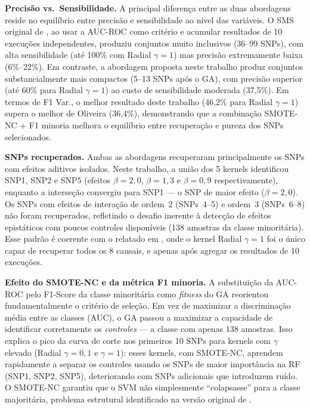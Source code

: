 \documentclass[
    12pt,
    a4paper,
    oneside,
    english,
    french,
    spanish,
    brazil
    ]{abntex2}
\newcommand{\novo}[1]{\textcolor{corNova}{#1}}
\begin{document}
\novo{\textbf{Precisão vs.\ Sensibilidade.}
A principal diferença entre as duas abordagens reside no equilíbrio entre precisão e sensibilidade ao nível das variáveis. O SMS original de \citeonline{Oliveira2015}, ao usar a AUC-ROC como critério e acumular resultados de 10 execuções independentes, produziu conjuntos muito inclusivos (36--99 SNPs), com alta sensibilidade (até 100\% com Radial $\gamma=1$) mas precisão extremamente baixa (6\%--22\%). Em contraste, a abordagem proposta neste trabalho produz conjuntos substancialmente mais compactos (5--13 SNPs após o GA), com precisão superior (até 60\% para Radial $\gamma=1$) ao custo de sensibilidade moderada (37,5\%). Em termos de F1 Var., o melhor resultado deste trabalho (46,2\% para Radial $\gamma=1$) supera o melhor de Oliveira (36,4\%), demonstrando que a combinação SMOTE-NC + F1 minoria melhora o equilíbrio entre recuperação e pureza dos SNPs selecionados.}

\novo{\textbf{SNPs recuperados.}
Ambas as abordagens recuperaram principalmente os SNPs com efeitos aditivos isolados. Neste trabalho, a união dos 5 kernels identificou SNP1, SNP2 e SNP5 (efeitos $\beta=2{,}0$, $\beta=1{,}3$ e $\beta=0{,}9$ respectivamente), enquanto a interseção convergiu para SNP1 --- o SNP de maior efeito ($\beta=2{,}0$). Os SNPs com efeitos de interação de ordem~2 (SNPs~4--5) e ordem~3 (SNPs~6--8) não foram recuperados, refletindo o desafio inerente à detecção de efeitos epistáticos com poucos controles disponíveis (138 amostras da classe minoritária). Esse padrão é coerente com o relatado em \citeonline{Oliveira2015}, onde o kernel Radial $\gamma=1$ foi o único capaz de recuperar todos os 8 causais, e apenas após agregar os resultados de 10 execuções.}

\novo{\textbf{Efeito do SMOTE-NC e da métrica F1 minoria.}
A substituição da AUC-ROC pelo F1-Score da classe minoritária como \textit{fitness} do GA reorientou fundamentalmente o critério de seleção. Em vez de maximizar a discriminação média entre as classes (AUC), o GA passou a maximizar a capacidade de identificar corretamente os \textit{controles} --- a classe com apenas 138 amostras. Isso explica o pico da curva de corte nos primeiros 10 SNPs para kernels com $\gamma$ elevado (Radial $\gamma=0{,}1$ e $\gamma=1$): esses kernels, com SMOTE-NC, aprendem rapidamente a separar os controles usando os SNPs de maior importância na RF (SNP1, SNP2, SNP5), deteriorando com SNPs adicionais que introduzem ruído. O SMOTE-NC garantiu que o SVM não simplesmente ``colapsasse'' para a classe majoritária, problema estrutural identificado na versão original de \citeonline{Oliveira2015}.}
\end{document}
